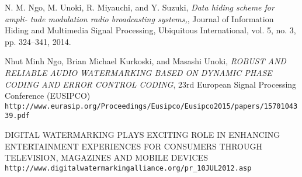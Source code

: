 \documentclass[a4paper, 13pt, oneside]{Thesis}  %
\begin{document}
\begin{thebibliography}{9}
N. M. Ngo, M. Unoki, R. Miyauchi, and Y. Suzuki, \textit{Data hiding scheme for ampli-
tude modulation radio broadcasting systems,}, Journal of Information Hiding and
Multimedia Signal Processing, Ubiquitous International, vol. 5, no. 3, pp. 324–341,
2014.

Nhut Minh Ngo, Brian Michael Kurkoski, and Masashi Unoki, \textit{ROBUST AND RELIABLE AUDIO WATERMARKING BASED ON
DYNAMIC PHASE CODING AND ERROR CONTROL CODING}, 23rd European Signal Processing Conference (EUSIPCO) 
\\\texttt{http://www.eurasip.org/Proceedings/Eusipco/Eusipco2015/papers/1570104339.pdf}

DIGITAL WATERMARKING PLAYS EXCITING ROLE IN ENHANCING ENTERTAINMENT EXPERIENCES FOR CONSUMERS THROUGH TELEVISION, MAGAZINES AND MOBILE DEVICES
\\\texttt{http://www.digitalwatermarkingalliance.org/pr\_{}10JUL2012.asp}

\end{thebibliography}



\appendix %




\backmatter

\end{document}
